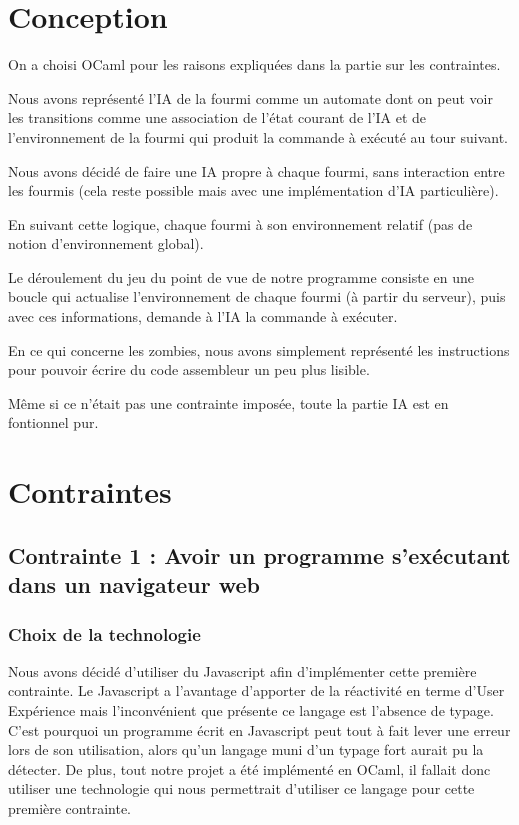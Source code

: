 \documentclass[12pt,a4paper]{report}
\begin{document}
\chapter{Conception}

On a choisi OCaml pour les raisons expliquées dans la partie sur les contraintes.

Nous avons représenté l'IA de la fourmi comme un automate dont on peut voir les
transitions comme une association de l'état courant de l'IA  et de
l'environnement de la fourmi qui produit la commande à exécuté au tour
suivant.\newline
 
Nous avons décidé de faire une IA  propre à chaque fourmi, sans interaction
entre les fourmis (cela reste possible mais avec une implémentation d'IA
particulière). \newline

En suivant cette logique, chaque fourmi à son environnement relatif (pas de
notion d'environnement global). \newline 

Le déroulement du jeu du point de vue de notre programme consiste en une boucle
qui actualise l'environnement de chaque fourmi (à partir du serveur), puis avec
ces informations, demande à l'IA la commande à exécuter. \newline 

En ce qui concerne les zombies, nous avons simplement représenté les instructions
pour pouvoir écrire du code assembleur un peu plus lisible. \newline 

Même si ce n'était pas une contrainte imposée, toute la partie IA est en
fontionnel pur.
\chapter{Contraintes}

\section{Contrainte 1 : Avoir un programme s'exécutant dans un navigateur web}

\subsection{Choix de la technologie}

Nous avons décidé d'utiliser du Javascript afin d'implémenter cette première
contrainte. Le Javascript a l'avantage d'apporter de la réactivité en terme
d'User Expérience mais l'inconvénient que présente ce langage est l'absence
de typage. C'est pourquoi un programme écrit en Javascript peut tout à fait
lever une erreur lors de son utilisation, alors qu'un langage muni d'un
typage fort aurait pu la détecter. De plus, tout notre projet a été
implémenté en OCaml, il fallait donc utiliser une technologie qui nous
permettrait d'utiliser ce langage pour cette première contrainte. \newline
\end{document}
